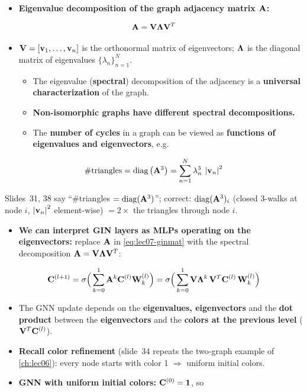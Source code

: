 \begin{itemize}
  \item \textbf{Eigenvalue decomposition of the graph adjacency matrix $\mathbf{A}$:}
\end{itemize}
\begin{equation}\label{eq:lec07-eig}
  \mathbf{A} = \mathbf{V}\bm{\Lambda}\mathbf{V}^T
\end{equation}
\begin{itemize}
  \item $\mathbf{V}=[\mathbf{v}_1,\dots,\mathbf{v}_n]$ is the orthonormal matrix of eigenvectors;
    $\bm{\Lambda}$ is the diagonal matrix of eigenvalues $\{\lambda_n\}_{n=1}^N$.
    \begin{itemize}
      \item The eigenvalue (\textbf{spectral}) decomposition of the adjacency is a
        \textbf{universal characterization} of the graph.
      \item \textbf{Non-isomorphic graphs have different spectral
        decompositions.}
      \item The \textbf{number of cycles} in a graph can be viewed as
        \textbf{functions of eigenvalues and eigenvectors}, e.g.
    \end{itemize}
\end{itemize}
\begin{equation}\label{eq:lec07-tri}
  \#\text{triangles} = \operatorname{diag}\big(\mathbf{A}^3\big) = \sum_{n=1}^{N}\lambda_n^3\,\left\lvert \mathbf{v}_n \right\rvert^2
\end{equation}
\begin{caution}
  Slides~31, 38 say ``$\#$triangles $=\operatorname{diag}(\mathbf{A}^3)$''; correct: $\operatorname{diag}(\mathbf{A}^3)_i$
  (closed 3-walks at node $i$, $\left\lvert \mathbf{v}_n \right\rvert^2$ element-wise) $=2\times$ the
  triangles through node $i$.
\end{caution}
\begin{itemize}
  \item \textbf{We can interpret GIN layers as MLPs operating on the
    eigenvectors:} replace $\mathbf{A}$ in \cref{eq:lec07-ginmat} with the spectral
    decomposition $\mathbf{A}=\mathbf{V}\bm{\Lambda}\mathbf{V}^T$:
\end{itemize}
\begin{equation}\label{eq:lec07-ginspec}
  \mathbf{C}^{(l+1)} = \sigma\Big(\sum_{k=0}^{1}\mathbf{A}^k\mathbf{C}^{(l)}\mathbf{W}_k^{(l)}\Big)
  = \sigma\Big(\sum_{k=0}^{1}\mathbf{V}\bm{\Lambda}^k\,\mathbf{V}^T\mathbf{C}^{(l)}\,\mathbf{W}_k^{(l)}\Big)
\end{equation}
\begin{itemize}
  \item The GNN update depends on the \textbf{eigenvalues, eigenvectors} and the
    \textbf{dot product} between the \textbf{eigenvectors} and the \textbf{colors
    at the previous level} ($\mathbf{V}^T\mathbf{C}^{(l)}$).
  \item \textbf{Recall color refinement} (slide~34 repeats the two-graph example
    of \cref{ch:lec06}): every node starts with color 1 $\Rightarrow$ uniform
    initial colors.
  \item \textbf{GNN with uniform initial colors:} $\mathbf{C}^{(0)}=\mathbf{1}$, so
\end{itemize}
